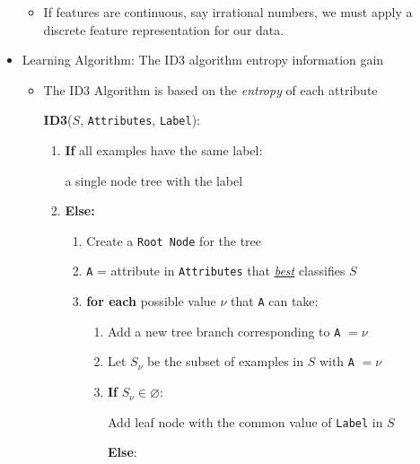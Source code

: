\documentclass{article}
\begin{document}
\begin{itemize}
\begin{itemize}
\begin{center}
	\end{center}
	\item If features are continuous, say irrational numbers, we must apply a discrete feature representation for our data. 
	\end{itemize}
\item Learning Algorithm: The ID3 algorithm entropy information gain
	\begin{itemize}
	\item The ID3 Algorithm is based on the {\em entropy} of each attribute

	{\bf ID3}($S$, {\tt Attributes}, {\tt Label}):

		\begin{enumerate}
		\item {\bf If} all examples have the same label:
		
		\hspace{2em}{\bf Return} a single node tree with the label
		\item {\bf Else:}
			\begin{enumerate}
			\item Create a \verb~Root Node~ for the tree
			\item \verb~A~ = attribute in \verb~Attributes~ that {\em \underline{best}} classifies $S$
			\item {\bf for each} possible value $\nu$ that \verb~A~ can take:
				\begin{enumerate}
				\item Add a new tree branch corresponding to \verb~A~ $=\nu$
				\item Let $S_{\nu}$ be the subset of examples in $S$ with \verb~A~ $ =\nu$
				\item {\bf If} $S_{\nu}\in\varnothing$:
				
				\hspace{1em}Add leaf node with the common value of \verb~Label~ in $S$
	
				{\bf Else}:


\end{enumerate}
\end{enumerate}
\end{enumerate}
\end{itemize}
\end{itemize}
\end{document}
